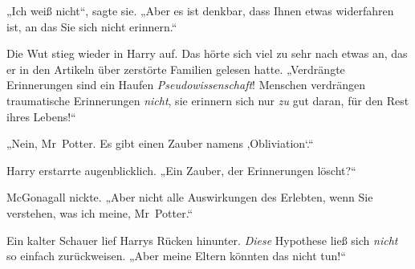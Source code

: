 „Ich weiß nicht“, sagte sie.
„Aber es ist denkbar, dass Ihnen etwas widerfahren ist, an das Sie sich nicht erinnern.“

Die Wut stieg wieder in Harry auf. Das hörte sich viel zu sehr nach etwas an, das er in den Artikeln über zerstörte Familien gelesen hatte.
„Verdrängte Erinnerungen sind ein Haufen \emph{Pseudowissenschaft}! Menschen verdrängen traumatische Erinnerungen \emph{nicht}, sie erinnern sich nur \emph{zu} gut daran, für den Rest ihres Lebens!“

„Nein, Mr~Potter. Es gibt einen Zauber namens ‚Obliviation‘.“

Harry erstarrte augenblicklich.
„Ein Zauber, der Erinnerungen löscht?“

McGonagall nickte.
„Aber nicht alle Auswirkungen des Erlebten, wenn Sie verstehen, was ich meine, Mr~Potter.“

Ein kalter Schauer lief Harrys Rücken hinunter. \emph{Diese} Hypothese ließ sich \emph{nicht} so einfach zurückweisen.
„Aber meine Eltern könnten das nicht tun!“

